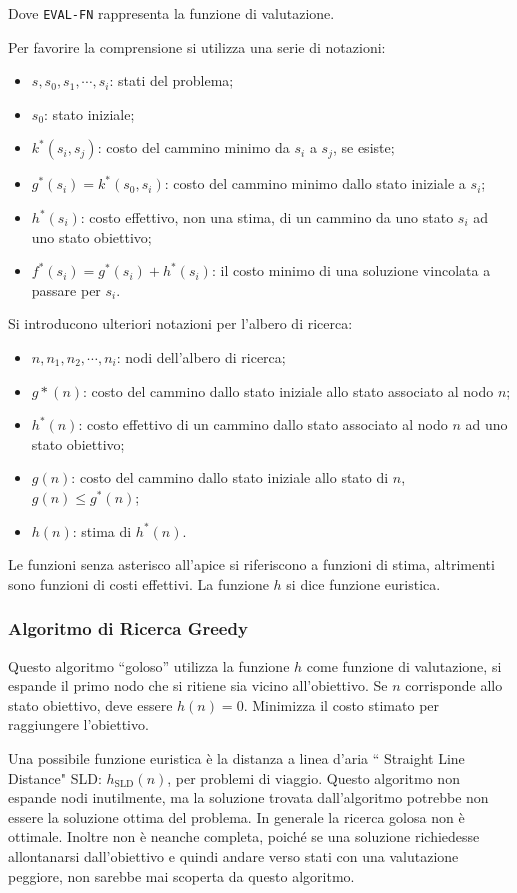 \documentclass{article}
\numberwithin{equation}{subsection}
\begin{document}
Dove \verb|EVAL-FN| rappresenta la funzione di valutazione. 

Per favorire la comprensione si utilizza una serie di notazioni:
\begin{itemize}
    \item $s,s_0,s_1,\cdots,s_i$: stati del problema;
    \item $s_0$: stato iniziale;
    \item $k^*(s_i,s_j)$: costo del cammino minimo da $s_i$ a $s_j$, se esiste;
    \item $g^*(s_i)=k^*(s_0,s_i)$: costo del cammino minimo dallo stato iniziale a $s_i$;
    \item $h^*(s_i)$: costo effettivo, non una stima, di un cammino da uno stato $s_i$ ad uno stato obiettivo;
    \item $f^*(s_i)=g^*(s_i)+h^*(s_i)$: il costo minimo di una soluzione vincolata a passare per $s_i$. 
\end{itemize}
Si introducono ulteriori notazioni per l'albero di ricerca:
\begin{itemize}
    \item $n,n_1,n_2,\cdots,n_i$: nodi dell'albero di ricerca;
    \item $g*(n)$: costo del cammino dallo stato iniziale allo stato associato al nodo $n$;
    \item $h^*(n)$: costo effettivo di un cammino dallo stato associato al nodo $n$ ad uno stato obiettivo;
    \item $g(n)$: costo del cammino dallo stato iniziale allo stato di $n$, $g(n)\leq g^*(n)$;
    \item $h(n)$: stima di $h^*(n)$. 
\end{itemize}

Le funzioni senza asterisco all'apice si riferiscono a funzioni di stima, altrimenti sono funzioni di costi effettivi. La funzione $h$ si dice funzione euristica. 

\subsubsection{Algoritmo di Ricerca Greedy}

Questo algoritmo ``goloso'' utilizza la funzione $h$ come funzione di valutazione, si espande il primo nodo che si ritiene sia vicino all'obiettivo. Se $n$ 
corrisponde allo stato obiettivo, deve essere $h(n)=0$. Minimizza il costo stimato per raggiungere l'obiettivo. 

Una possibile funzione euristica è la distanza a linea d'aria `` Straight Line Distance" SLD: $h_{\mathrm{SLD}}(n)$, per problemi di viaggio. Questo algoritmo non 
espande nodi inutilmente, ma la soluzione trovata dall'algoritmo potrebbe non essere la soluzione ottima del problema. In generale la ricerca golosa non è 
ottimale. Inoltre non è neanche completa, poiché se una soluzione richiedesse allontanarsi dall'obiettivo e quindi andare verso stati con una valutazione peggiore, non 
sarebbe mai scoperta da questo algoritmo. 
\end{document}
